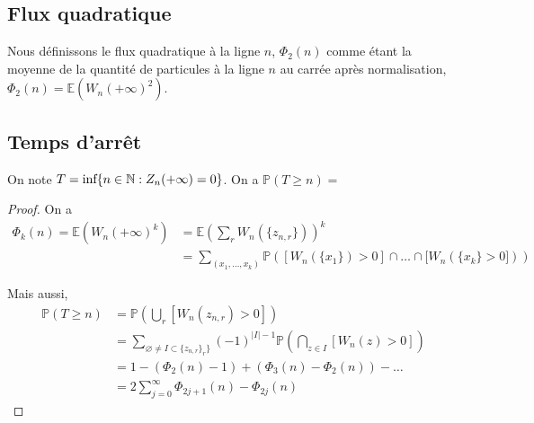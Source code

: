 \documentclass{article}
\theoremstyle{definition}
\begin{document}
\subsection{Flux quadratique}
Nous définissons le flux quadratique à la ligne $n$, $\Phi_{2}(n)$ comme étant la moyenne de la quantité de particules à la ligne $n$ au carrée après normalisation, $\Phi_{2}(n) = \mathbb{E}(W_n(+\infty)^2)$.
\subsection{Temps d'arrêt}
On note $T = \textup{inf}\{n \in \mathbb{N} : Z_n(+\infty) = 0\}$. On a $\mathds{P}(T\geq n) = $
\begin{proof}
	On a \begin{align*}
	\Phi_k(n) = \mathbb{E}(W_n(+\infty)^k) &=\mathbb{E}(\sum_{r}W_n(\{z_{n,r}\}))^k\\& = \sum_{(x_1, \ldots, x_k)} \mathds{P}([W_n(\{x_1\})>0]\cap\ldots\cap [W_n(\{x_k\} > 0]))\end{align*}

	Mais aussi, \begin{align*}
		\mathds{P}(T\geq n) &= \mathds{P}(\bigcup_{r} [W_n(z_{n,r}) > 0])\\
				    &=\sum_{\varnothing\neq I\subset \{z_{n,r}\}_r\}}(-1)^{|I|-1}\mathds{P}(\bigcap_{z\in I} [W_n(z) > 0])\\
				    &=1-(\Phi_2(n)-1)+(\Phi_3(n)-\Phi_2(n))-\ldots\\
				    &=2\sum_{j=0}^\infty \Phi_{2j+1}(n)-\Phi_{2j}(n)
	\end{align*}
\end{proof}
\end{document}
